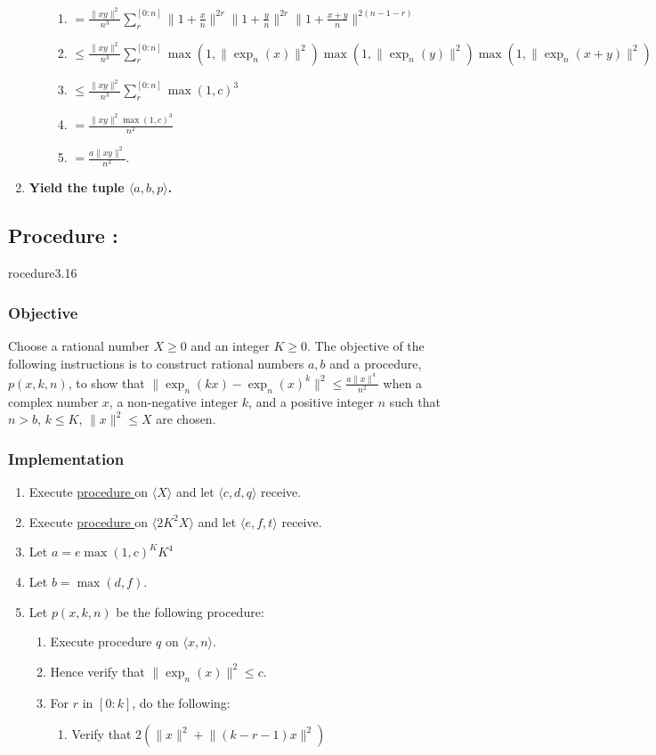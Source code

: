 \documentclass{article}
\newcounter{procedure}[part]
\newcommand{\procedure}[1]{\subsection*{Procedure \thepart:\theprocedure}\label{sec:procedure #1}\global\expandafter\edef\csname procedure#1\endcsname{\thepart:\theprocedure}\addtocounter{procedure}{1}}
\newcommand{\objective}{\subsubsection*{Objective}}
\newcommand{\implementation}{\subsubsection*{Implementation}}
\newcommand{\procedurehr}[1]{\hyperref[sec:procedure #1]{procedure \expandafter\csname procedure#1\endcsname}}
\begin{document}
\begin{multicols}{2}
\begin{enumerate}
\begin{enumerate}
\begin{enumerate}
							\item $=\frac{\lVert xy\rVert^2}{n^3}\sum_r^{[0:n]}\lVert 1+\frac{x}{n}\rVert^{2r}\lVert 1+\frac{y}{n}\rVert^{2r}\lVert 1+\frac{x+y}{n}\rVert^{2(n-1-r)}$
							\item $\le\frac{\lVert xy\rVert^2}{n^3}\sum_r^{[0:n]}\max(1,\lVert\exp_n(x)\rVert^{2})\allowbreak\max(1,\lVert\exp_n(y)\rVert^{2})\allowbreak\max(1,\lVert\exp_n(x+y)\rVert^{2})$
							\item $\le\frac{\lVert xy\rVert^2}{n^3}\sum_r^{[0:n]}\max(1,c)^3$
							\item $=\frac{\lVert xy\rVert^2\max(1,c)^3}{n^2}$
							\item $=\frac{a\lVert xy\rVert^2}{n^2}$.
						\end{enumerate}
					\end{enumerate}
					\item \textbf{Yield the tuple $\langle a,b,p\rangle$.}
				\end{enumerate}
		\procedure{3.16}
			\objective
				Choose a rational number $X\ge 0$ and an integer $K\ge 0$. The objective of the following instructions is to construct rational numbers $a,b$ and a procedure, $p(x,k,n)$, to show that $\lVert\exp_n(kx)-\exp_n(x)^k\rVert^2\le\frac{a\lVert x\rVert^4}{n^2}$ when a complex number $x$, a non-negative integer $k$, and a positive integer $n$ such that $n>b$, $k\le K$, $\lVert x\rVert^2\le X$ are chosen.
			\implementation
				\begin{enumerate}
					\item Execute \procedurehr{3.13} on $\langle X\rangle$ and let $\langle c,d,q\rangle$ receive.
					\item Execute \procedurehr{3.15} on $\langle 2K^2X\rangle$ and let $\langle e,f,t\rangle$ receive.
					\item Let $a=e\max(1,c)^KK^4$
					\item Let $b=\max(d,f)$.
					\item Let $p(x,k,n)$ be the following procedure:
					\begin{enumerate}
						\item Execute procedure $q$ on $\langle x,n\rangle$.
						\item Hence verify that $\lVert\exp_n(x)\rVert^2\le c$.
						\item For $r$ in $[0:k]$, do the following:
						\begin{enumerate}
							\item Verify that $2(\lVert x\rVert^2+\lVert(k-r-1)x\rVert^2)$
							\begin{enumerate}

\end{enumerate}
\end{enumerate}
\end{enumerate}
\end{enumerate}
\end{multicols}
\end{document}
